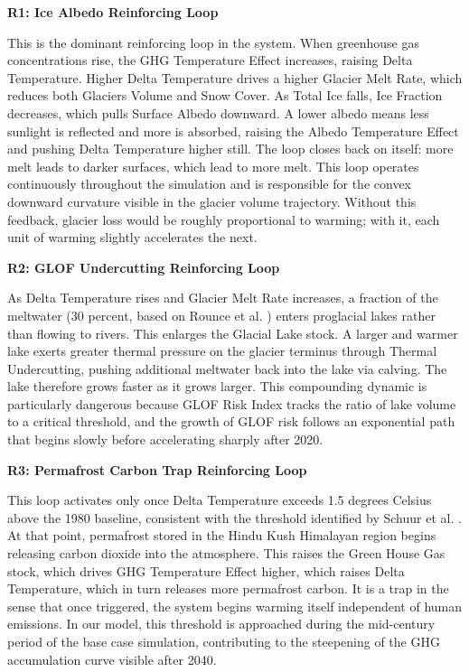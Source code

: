 \documentclass[12pt, a4paper]{article}
\begin{document}
\textbf{R1: Ice Albedo Reinforcing Loop}

This is the dominant reinforcing loop in the system. When greenhouse gas concentrations rise, the GHG Temperature Effect increases, raising Delta Temperature. Higher Delta Temperature drives a higher Glacier Melt Rate, which reduces both Glaciers Volume and Snow Cover. As Total Ice falls, Ice Fraction decreases, which pulls Surface Albedo downward. A lower albedo means less sunlight is reflected and more is absorbed, raising the Albedo Temperature Effect and pushing Delta Temperature higher still. The loop closes back on itself: more melt leads to darker surfaces, which lead to more melt. This loop operates continuously throughout the simulation and is responsible for the convex downward curvature visible in the glacier volume trajectory. Without this feedback, glacier loss would be roughly proportional to warming; with it, each unit of warming slightly accelerates the next.

\textbf{R2: GLOF Undercutting Reinforcing Loop}

As Delta Temperature rises and Glacier Melt Rate increases, a fraction of the meltwater (30 percent, based on Rounce et al. \cite{rounce2020}) enters proglacial lakes rather than flowing to rivers. This enlarges the Glacial Lake stock. A larger and warmer lake exerts greater thermal pressure on the glacier terminus through Thermal Undercutting, pushing additional meltwater back into the lake via calving. The lake therefore grows faster as it grows larger. This compounding dynamic is particularly dangerous because GLOF Risk Index tracks the ratio of lake volume to a critical threshold, and the growth of GLOF risk follows an exponential path that begins slowly before accelerating sharply after 2020.

\textbf{R3: Permafrost Carbon Trap Reinforcing Loop}

This loop activates only once Delta Temperature exceeds 1.5 degrees Celsius above the 1980 baseline, consistent with the threshold identified by Schuur et al. \cite{schuur2015}. At that point, permafrost stored in the Hindu Kush Himalayan region begins releasing carbon dioxide into the atmosphere. This raises the Green House Gas stock, which drives GHG Temperature Effect higher, which raises Delta Temperature, which in turn releases more permafrost carbon. It is a trap in the sense that once triggered, the system begins warming itself independent of human emissions. In our model, this threshold is approached during the mid-century period of the base case simulation, contributing to the steepening of the GHG accumulation curve visible after 2040.
\end{document}
